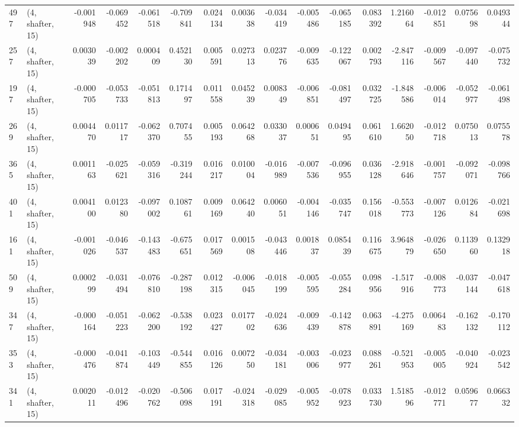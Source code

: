 \begin{tabular}{llrrrrrrrrrrrrrr}
497 &  (4, shafter, 15) &  -0.001948 & -0.069452 & -0.061518 &   -0.709841 &  0.024134 &   0.003638 & -0.034419 & -0.005486 & -0.065185 &  0.083392 &    1.216064 & -0.012851 &  0.075698 &  0.049344 \\
257 &  (4, shafter, 15) &   0.003039 & -0.002202 &  0.000409 &    0.452130 &  0.005591 &   0.027313 &  0.023776 & -0.009635 & -0.122067 &  0.002793 &   -2.847116 & -0.009567 & -0.097440 & -0.075732 \\
197 &  (4, shafter, 15) &  -0.000705 & -0.053733 & -0.051813 &    0.171497 &  0.011558 &   0.045239 &  0.008349 & -0.006851 & -0.081497 &  0.032725 &   -1.848586 & -0.006014 & -0.052977 & -0.061498 \\
269 &  (4, shafter, 15) &   0.004470 &  0.011717 & -0.062370 &    0.707455 &  0.005193 &   0.064268 &  0.033037 &  0.000651 &  0.049495 &  0.061610 &    1.662050 & -0.012718 &  0.075013 &  0.075578 \\
365 &  (4, shafter, 15) &   0.001163 & -0.025621 & -0.059316 &   -0.319244 &  0.016217 &   0.010004 & -0.016989 & -0.007536 & -0.096955 &  0.036128 &   -2.918646 & -0.001757 & -0.092071 & -0.098766 \\
401 &  (4, shafter, 15) &   0.004100 &  0.012380 & -0.097002 &    0.108761 &  0.009169 &   0.064240 &  0.006051 & -0.004146 & -0.035747 &  0.156018 &   -0.553773 & -0.007126 &  0.012684 & -0.021698 \\
161 &  (4, shafter, 15) &  -0.001026 & -0.046537 & -0.143483 &   -0.675651 &  0.017569 &   0.001508 & -0.043446 &  0.001837 &  0.085439 &  0.116675 &    3.964879 & -0.026650 &  0.113960 &  0.132918 \\
509 &  (4, shafter, 15) &   0.000299 & -0.031494 & -0.076810 &   -0.287198 &  0.012315 &  -0.006045 & -0.018199 & -0.005595 & -0.055284 &  0.098956 &   -1.517916 & -0.008773 & -0.037144 & -0.047618 \\
347 &  (4, shafter, 15) &  -0.000164 & -0.051223 & -0.062200 &   -0.538192 &  0.023427 &   0.017702 & -0.024636 & -0.009439 & -0.142878 &  0.063891 &   -4.275169 &  0.006483 & -0.162132 & -0.170112 \\
353 &  (4, shafter, 15) &  -0.000476 & -0.041874 & -0.103449 &   -0.544855 &  0.016126 &   0.007250 & -0.034181 & -0.003006 & -0.023977 &  0.088261 &   -0.521953 & -0.005005 & -0.040924 & -0.023542 \\
341 &  (4, shafter, 15) &   0.002011 & -0.012496 & -0.020762 &   -0.506098 &  0.017191 &  -0.024318 & -0.029085 & -0.005952 & -0.078923 &  0.033730 &    1.518596 & -0.012771 &  0.059677 &  0.066332 \\

\end{tabular}
